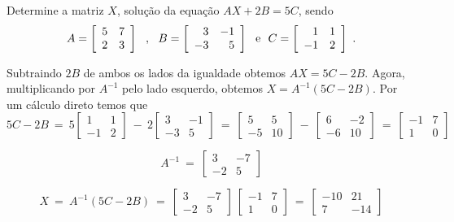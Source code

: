 \begin{problem}
Determine a matriz $X$, solução da equação $AX + 2B = 5C$, sendo
$$A = \left[\begin{array}{rr}
	5 &  7  \\
	2 &  3  \end{array}\right] \ \ , \ \
B = \left[\begin{array}{rr}
	3 &  -1  \\
 -3 &   5  \end{array}\right]\ \ {\rm e} \ \
C = \left[\begin{array}{rr}
	1 &   1  \\
 -1 &   2  \end{array}\right]\ . $$
\end{problem}
\begin{solution}
Subtraindo $2B$ de ambos os lados da igualdade obtemos $AX = 5C - 2B$. 
Agora, multiplicando por $A^{-1}$ pelo lado esquerdo, obtemos $X = A^{-1} (5C-2B)$.
Por um cálculo direto temos que
$$5C-2B\ =\ 
5\left[\begin{array}{rr}
	1 &   1  \\
 -1 &   2  \end{array}\right]\ -\ 
2\left[\begin{array}{rr}
	3 &  -1  \\
 -3 &   5  \end{array}\right]\ =\ 
\left[\begin{array}{rr}
	5 &    5  \\
 -5 &   10  \end{array}\right]\ -\ 
\left[\begin{array}{rr}
	6 &  -2  \\
 -6 &  10  \end{array}\right]\ =\ 
\left[\begin{array}{rr}
 -1 &  7  \\
	1 &  0  \end{array}\right]$$

$$A^{-1}\ =\ 
\left[\begin{array}{rr}
	3 &   -7  \\
 -2 &   5  \end{array}\right]$$

$$X\ =\ A^{-1} (5C-2B)\ =\ 
\left[\begin{array}{rr}
	3 &   -7  \\
 -2 &   5  \end{array}\right]\ 
\left[\begin{array}{rr}
 -1 &  7  \\
	1 &  0  \end{array}\right]\ =\ 
\left[\begin{array}{rr}
 -10 &  21  \\
	 7 & -14  \end{array}\right]$$
\end{solution}

